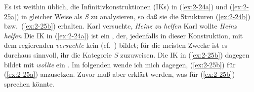 \documentclass[output=paper]{langsci/langscibook}
\begin{document}
Es ist weithin üblich, die Infinitivkonstruktionen (IKs) in (\ref{ex:2-24a}) und (\ref{ex:2-25a}) in gleicher Weise als \textit{S} zu analysieren, so daß sie die Strukturen (\ref{ex:2-24b}) bzw.\ (\ref{ex:2-25b}) erhalten.
\eal \label{ex:2-24}
	\ex Karl versuchte, \textit{Heinz zu helfen} \label{ex:2-24a}
	 \label{ex:2-24b}
\zl
\eal \label{ex:2-25}
	\ex Karl wollte \textit{Heinz helfen} \label{ex:2-25a}
	 \label{ex:2-25b}
\zl
Die IK in (\ref{ex:2-24a}) ist ein , der, jedenfalls in dieser Konstruktion, mit dem regierenden  \textit{versuchte} kein  (cf.\ \citealt{Bech1955}) bildet; für die meisten Zwecke ist es durchaus sinnvoll, ihr die Kategorie \textit{S} zuzuweisen. Die IK in (\ref{ex:2-25b}) dagegen bildet mit \textit{wollte} ein . Im folgenden wende ich mich dagegen, (\ref{ex:2-25b}) für (\ref{ex:2-25a}) anzusetzen. Zuvor muß aber erklärt werden, was für (\ref{ex:2-25b}) sprechen könnte.
\end{document}
